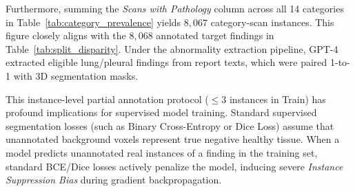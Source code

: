 \documentclass[11pt,a4paper]{article}
\begin{document}
Furthermore, summing the \textit{Scans with Pathology} column across all 14 categories in Table~\ref{tab:category_prevalence} yields $8,067$ category-scan instances. This figure closely aligns with the $8,068$ annotated target findings in Table~\ref{tab:split_disparity}. Under the abnormality extraction pipeline, GPT-4 extracted eligible lung/pleural findings from report texts, which were paired 1-to-1 with 3D segmentation masks.

This instance-level partial annotation protocol ($\le 3$ instances in Train) has profound implications for supervised model training. Standard supervised segmentation losses (such as Binary Cross-Entropy or Dice Loss) assume that unannotated background voxels represent true negative healthy tissue. When a model predicts unannotated real instances of a finding in the training set, standard BCE/Dice losses actively penalize the model, inducing severe \textit{Instance Suppression Bias} during gradient backpropagation.
\end{document}
